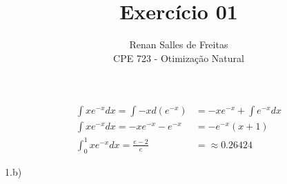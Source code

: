 \documentclass[12pt]{article}
\newenvironment{exercise}[2][Exercício]{\begin{trivlist}
\item[\hskip \labelsep {\bfseries #1}\hskip \labelsep {\bfseries #2.}]}{\end{trivlist}}
\begin{document}
 
 
\title{Exercício 01}
\author{Renan Salles de Freitas\\
CPE 723 - Otimização Natural}
 
\maketitle
 
\begin{exercise}{1.a} 
\begin{align*}
\int xe^{-x} dx = \int -x d(e^{-x}) &= -xe^{-x} + \int e^{-x} dx \\
\int xe^{-x} dx = -xe^{-x} - e^{-x} &= -e^{-x} (x+1)  \\
\int_{0}^{1} xe^{-x} dx = \frac{e-2}{e} &= \approx 0.26424
\end{align*}
\end{exercise}
 
\begin{exercise}(1.b)
 
 

\end{exercise}
 
\end{document}
